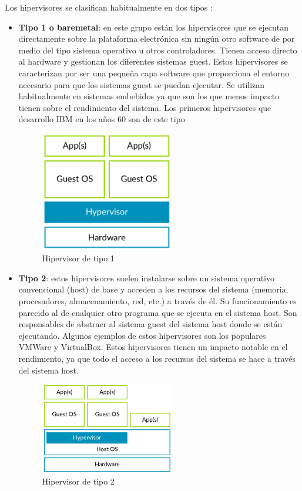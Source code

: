 Los hipervisores se clasifican habitualmente en dos tipos \cite{Popek1974}\cite{hyper_review}:
\begin{itemize}
\item \textbf{Tipo 1 o baremetal}: en este grupo están los hipervisores que se ejecutan directamente sobre
la plataforma electrónica sin ningún otro software de por medio del tipo sistema operativo u
otros controladores. Tienen acceso directo al hardware y gestionan los diferentes sistemas guest. Estos hipervisores se caracterizan por ser una pequeña capa software que proporciona el entorno necesario para que los sistemas guest se puedan ejecutar. Se utilizan habitualmente en sistemas embebidos ya que son los que menos impacto tienen sobre el rendimiento del sistema. Los primeros hipervisores que desarrollo IBM en los años 60 son de este tipo \cite{hyper_review}\\
\begin{figure}[h]
	\centering
	\includegraphics[width=0.55\textwidth]{recursos/type1_hyp.png}
	\caption{Hipervisor de tipo 1}
	\label{fig:hyper_type1}
\end{figure}
\item \textbf{Tipo 2}: estos hipervisores suelen instalarse sobre un sistema operativo convencional (host) de base y
acceden a los recursos del sistema (memoria, procesadores, almacenamiento, red, etc.) a
través de él. Su funcionamiento es parecido al de cualquier otro programa que se ejecuta en el sistema host. Son responsables de abstraer al sistema guest del sistema host donde se están ejecutando. Algunos ejemplos de estos hipervisores son los populares VMWare y VirtualBox. Estos hipervisores tienen un impacto notable en el rendimiento, ya que todo el acceso a los recursos del sistema se hace a través del sistema host.
\begin{figure}[h]
	\centering
	\includegraphics[width=0.55\textwidth]{recursos/type2_hyp.png}
	\caption{Hipervisor de tipo 2}
	\label{fig:hyper_type2}
\end{figure}
\\
\end{itemize}

